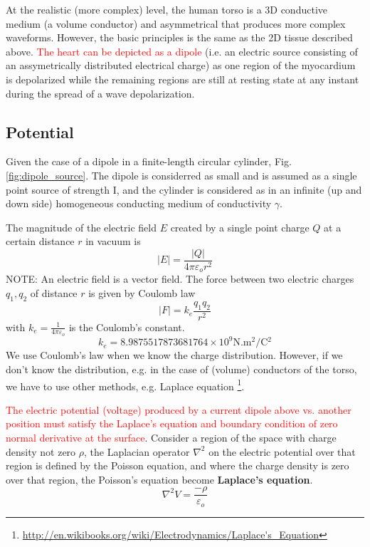 At the realistic (more complex) level, the human torso is a 3D conductive medium
(a volume conductor) and asymmetrical that produces more complex waveforms.
However, the basic principles is the same as the 2D tissue described above.
\textcolor{red}{The heart can be depicted as a dipole} (i.e. an electric source
consisting of an assymetrically distributed electrical charge) as one region of
the myocardium is depolarized while the remaining regions are still at resting
state at any instant during the spread of a wave depolarization.

\subsection{Potential}

Given the case of a dipole in a finite-length circular cylinder,
Fig.\ref{fig:dipole_source}.  The dipole is considerred as small and is assumed
as a single point source of strength I, and the cylinder is considered as in an
infinite (up and down side) homogeneous conducting medium of conductivity
$\gamma$. 

The magnitude of the electric field $E$ created by a single point charge $Q$ at
a certain distance $r$ in vacuum is
\begin{equation}
|E| = \frac{|Q|}{4\pi\varepsilon_o r^2}
\end{equation}
NOTE: An electric field is a vector field. The force between two electric
charges $q_1, q_2$ of distance $r$ is given by Coulomb law
\begin{equation}
|F| = k_e \frac{q_1q_2}{r^2}
\end{equation}
with $k_e=\frac{1}{4\pi\varepsilon_o}$ is the Coulomb's constant.
\begin{equation}
k_e = 8.9875517873681764 \times 10^9 \text{N.m$^2$/C$^2$}
\end{equation}
We use Coulomb's law when we know the charge distribution. However, if we don't
know the distribution, e.g. in the case of (volume) conductors of the torso, we
have to use other methods, e.g. Laplace equation
\footnote{\url{http://en.wikibooks.org/wiki/Electrodynamics/Laplace's_Equation}}.

\textcolor{red}{The electric potential (voltage) produced by a current dipole
above vs. another position must satisfy the Laplace's equation and boundary
condition of zero normal derivative at the surface}.  Consider a region of the
space with charge density not zero $\rho$, the Laplacian operator $\nabla^2$ on
the electric potential over that region is defined by the Poisson equation, and
where the charge density is zero over that region, the Poisson's equation become
{\bf Laplace's equation}. 	
\begin{equation}
\nabla^2 V = \frac{-\rho}{\varepsilon_o}
\end{equation}

